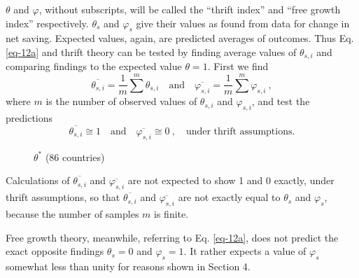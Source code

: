 \documentclass[a4paper,fleqn]{latex_styles/cas-sc}
\begin{document}
%
\(\theta\) and \(\varphi\), without subscripts, will be called the ``thrift index'' and
``free growth index'' respectively. \(\theta_{s}\) and
\(\varphi_{s}\) give their values as found from data for change in net
saving. 
%
Expected values, again, are predicted averages of outcomes. Thus Eq. \eqref{eq-12a} and thrift theory can be tested by finding average values of \(\theta_{s,i}\) and comparing findings to the expected value \(\theta = 1\). First we find
%
\[\overline{\theta_{s,i}} = \frac{1}{m} \sum^{m} \theta_{s,i} \quad \text{and} \quad
\overline{\varphi_{s,i}} = \frac{1}{m} \sum^{m} \varphi_{s,i}\ ,\]
%
where \(m\) is the number of observed values of \(\theta_{s,i}\) and
\(\varphi_{s,i}\), and test the predictions
\[
\overline{\theta_{s,i}} \cong 1 \quad \text{and} \quad \overline{\varphi_{s,i}} \cong 0\ , \quad \text{under thrift assumptions.}
\]
%
\FloatBarrier
\begin{figure}[pos=H]
    \centering
    \captionsetup{justification=centering}
    \caption{\(\theta^*\) (86 countries)} %
    \label{fig-s_c_theta_plots}
\end{figure}
%

%
\FloatBarrier

\FloatBarrier
%
Calculations of \(\overline{\theta_{s,i}}\) and
\(\overline{\varphi_{s,i}}\) are not expected to show 1 and 0 exactly,
under thrift assumptions, so that \(\overline{\theta_{s,i}}\) and \(\overline{\varphi_{s,i}}\) are not exactly equal to \(\theta_s\) and \(\varphi_s\), because the number of samples \(m\) is finite.

Free growth theory, meanwhile, referring to Eq. \eqref{eq-12a}, does not predict the exact opposite findings \(\theta_s = 0\) and \(\varphi_s = 1\). It rather expects a value of \(\varphi_s\) somewhat less than unity for reasons shown in Section 4.
\end{document}
